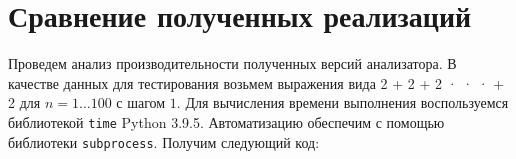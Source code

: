 \documentclass[bachelor, och, otchet]{SCWorks}
\begin{document}
\section{Сравнение полученных реализаций}
Проведем анализ производительности полученных версий анализатора. В качестве
данных для тестирования возьмем выражения вида 2 + 2 + 2 · · · + 2 для $n =
1\dots100$ с шагом $1$. Для вычисления времени выполнения воспользуемся
библиотекой \verb|time| Python 3.9.5. Автоматизацию обеспечим с помощью
библиотеки \verb|subprocess|. Получим следующий код:
























\conclusion

%

%





\appendix
\end{document}

